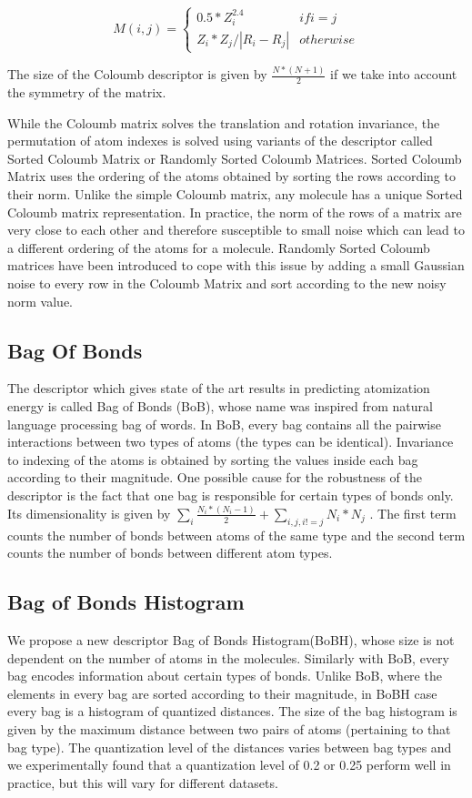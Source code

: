 \documentclass{article}
\begin{document}
\[M(i,j) = \left\{
  \begin{array}{lr}
    0.5*Z_i^{2.4} & if i = j\\
    Z_i * Z_j / |R_i - R_j| & otherwise
  \end{array}
\right.
\]

The size of the Coloumb descriptor is given by $\frac{N*(N + 1)}{2}$ if we take into account the symmetry of the matrix.

While the Coloumb matrix solves the translation and rotation invariance, the permutation of atom indexes is solved using variants of the descriptor called Sorted Coloumb Matrix or Randomly Sorted Coloumb Matrices.  Sorted Coloumb Matrix uses the ordering of the atoms obtained by sorting the rows according to their norm. Unlike the simple Coloumb matrix, any molecule has a unique Sorted Coloumb matrix representation.
In practice,  the norm of the rows of a matrix are very close to each other and therefore susceptible to small noise which can lead to a different ordering of the atoms for a molecule. Randomly Sorted Coloumb matrices have been introduced to cope with this issue by adding a small Gaussian noise to every row in the Coloumb Matrix and sort according to the new noisy norm value.

\subsection{Bag Of Bonds}
The descriptor which gives state of the art results in predicting atomization energy is called Bag of Bonds (BoB), whose name was inspired from natural language processing bag of words. In BoB, every bag contains all the pairwise interactions between two types of atoms (the types can be identical). Invariance to indexing of the atoms is obtained by sorting the values inside each bag according to their magnitude.
One possible cause for the robustness of the descriptor is the fact that one bag is responsible for certain types of bonds only.
Its dimensionality  is given by $\sum_i \frac{N_i*(N_i-1)}{2} + \sum_{i,j, i!=j} N_i*N_j	$ .
The first term counts the number of bonds between atoms of the same type and the second term counts the number of bonds between different atom types.

\subsection{Bag of Bonds Histogram}
We propose a new descriptor Bag of Bonds Histogram(BoBH), whose size is not dependent on the number of atoms in the molecules. Similarly with BoB, every bag  encodes information about certain types of bonds. Unlike BoB, where the elements in every bag are sorted according to their magnitude, in BoBH case every bag is a histogram of quantized distances. The size of the bag histogram is given by the maximum distance between two pairs of atoms (pertaining to that bag type). The quantization level of the distances varies between bag types and we experimentally found that a quantization level of 0.2 or 0.25 perform well in practice, but this will vary for different datasets.
\end{document}
